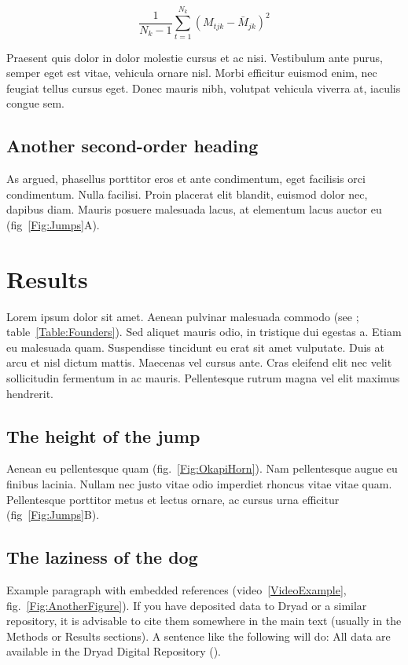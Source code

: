 ﻿\documentclass[11pt]{article}
\begin{document}
\begin{equation}
{ \frac{1}{N_k-1} \sum \limits_{t=1}^{N_k} (M_{tjk} - \bar{M}_{jk})^2}
\end{equation}

Praesent quis dolor in dolor molestie cursus et ac nisi. Vestibulum ante purus, semper eget est vitae, vehicula ornare nisl. Morbi efficitur euismod enim, nec feugiat tellus cursus eget. Donec mauris nibh, volutpat vehicula viverra at, iaculis congue sem.

\subsection*{Another second-order heading}

As \citet{Xiao2015} argued, phasellus porttitor eros et ante condimentum, eget facilisis orci condimentum. Nulla facilisi. Proin placerat elit blandit, euismod dolor nec, dapibus diam. Mauris posuere malesuada lacus, at elementum lacus auctor eu (fig~\ref{Fig:Jumps}A). 

\section*{Results}

Lorem ipsum dolor sit amet. Aenean pulvinar malesuada commodo (see \citealt{DavisEtAl2011}; table~\ref{Table:Founders}). Sed aliquet mauris odio, in tristique dui egestas a. Etiam eu malesuada quam. Suspendisse tincidunt eu erat sit amet vulputate. Duis at arcu et nisl dictum mattis. Maecenas vel cursus ante. Cras eleifend elit nec velit sollicitudin fermentum in ac mauris. Pellentesque rutrum magna vel elit maximus hendrerit. 

\subsection*{The height of the jump}

Aenean eu pellentesque quam (fig.~\ref{Fig:OkapiHorn}). Nam pellentesque augue eu finibus lacinia. Nullam nec justo vitae odio imperdiet rhoncus vitae vitae quam. Pellentesque porttitor metus et lectus ornare, ac cursus urna efficitur (fig~\ref{Fig:Jumps}B). 

\subsection*{The laziness of the dog}

Example paragraph with embedded references (video~\ref{VideoExample}, fig.~\ref{Fig:AnotherFigure}). 
If you have deposited data to Dryad or a similar repository, it is advisable to cite them somewhere in the main text (usually in the Methods or Results sections). A sentence like the following will do: All data are available in the Dryad Digital Repository (\citealt{CookEtAl2015}).
\end{document}
